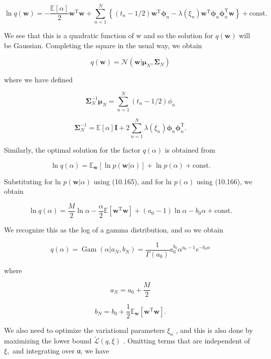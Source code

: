 \documentclass[
  10
]{article}
\begin{document}
\[
\ln q (\mathbf {w}) = - \frac {\mathbb {E} [ \alpha ]}{2} \mathbf {w} ^ {\mathrm{T}} \mathbf {w} + \sum_ {n = 1} ^ {N} \left\{(t _ {n} - 1 / 2) \mathbf {w} ^ {\mathrm{T}} \boldsymbol {\phi} _ {n} - \lambda (\xi_ {n}) \mathbf {w} ^ {\mathrm{T}} \boldsymbol {\phi} _ {n} \boldsymbol {\phi} _ {n} ^ {\mathrm{T}} \mathbf {w} \right\} + \mathrm{const.}
\]

We see that this is a quadratic function of w and so the solution for
\(q ( \mathbf { w } )\) will be Gaussian. Completing the square in the
usual way, we obtain

\[
q (\mathbf {w}) = \mathcal {N} (\mathbf {w} | \boldsymbol {\mu} _ {N}, \boldsymbol {\Sigma} _ {N})\tag{10.174}
\]

where we have defined

\[
\boldsymbol {\Sigma} _ {N} ^ {- 1} \boldsymbol {\mu} _ {N} = \sum_ {n = 1} ^ {N} (t _ {n} - 1 / 2) \phi_ {n}\tag{10.175}
\]

\[
\boldsymbol {\Sigma} _ {N} ^ {- 1} = \mathbb {E} [ \alpha ] \mathbf {I} + 2 \sum_ {n = 1} ^ {N} \lambda (\xi_ {n}) \boldsymbol {\phi} _ {n} \boldsymbol {\phi} _ {n} ^ {\mathrm{T}}.\tag{10.176}
\]

Similarly, the optimal solution for the factor \(q ( \alpha )\) is
obtained from

\[
\ln q (\alpha) = \mathbb {E} _ {\mathbf {w}} \left[ \ln p (\mathbf {w} | \alpha) \right] + \ln p (\alpha) + \mathrm{const.}
\]

Substituting for ln \(p ( \mathbf { w } | \alpha )\) using (10.165), and
for ln \(p ( \alpha )\) using (10.166), we obtain

\[
\ln q (\alpha) = \frac {M}{2} \ln \alpha - \frac {\alpha}{2} \mathbb {E} \left[ \mathbf {w} ^ {\mathrm{T}} \mathbf {w} \right] + (a _ {0} - 1) \ln \alpha - b _ {0} \alpha + \mathrm{const}.
\]

We recognize this as the log of a gamma distribution, and so we obtain

\[
q (\alpha) = \operatorname{Gam} (\alpha | a _ {N}, b _ {N}) = \frac {1}{\Gamma (a _ {0})} a _ {0} ^ {b _ {0}} \alpha^ {a _ {0} - 1} e ^ {- b _ {0} \alpha}\tag{10.177}
\]

where

\[
a _ {N} = a _ {0} + \frac {M}{2}\tag{10.178}
\]

\[
{b _ {N}} = {b _ {0} + \frac {1}{2} \mathbb {E} _ {\mathbf {w}} \left[ \mathbf {w} ^ {\mathrm{T}} \mathbf {w} \right].}\tag{10.179}
\]

We also need to optimize the variational parameters \(\xi _ { n }\) ,
and this is also done by maximizing the lower bound
\(\widetilde { \mathcal { L } } ( q , \xi )\) . Omitting terms that are
independent of \(\xi ,\) and integrating over α, we have
\end{document}
